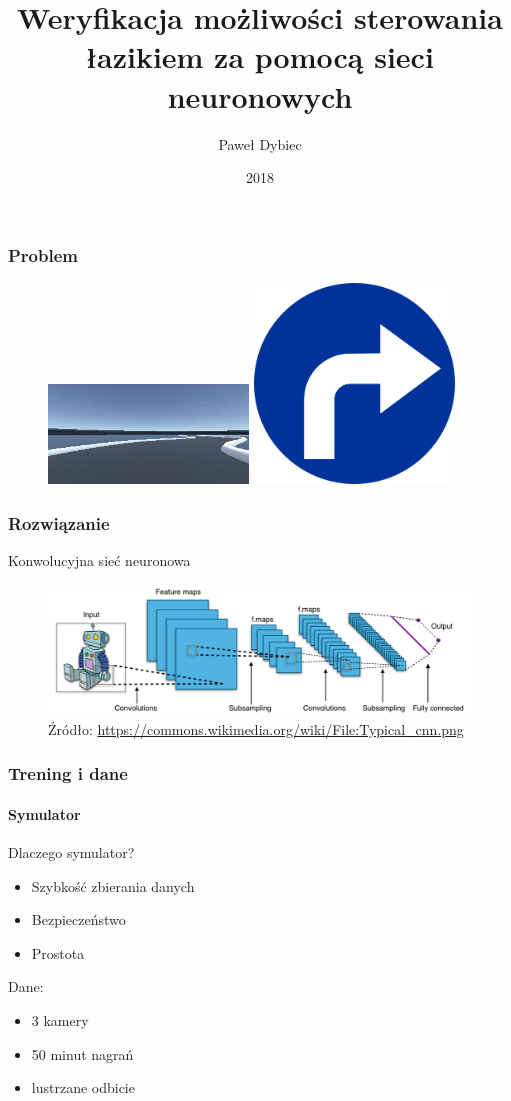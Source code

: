 \documentclass[polish]{beamer}
\title{Weryfikacja możliwości sterowania łazikiem za pomocą sieci neuronowych}
\author{Paweł Dybiec}
\date{2018}
\begin{document}
 
\frame{\titlepage}
 
\begin{frame}
\frametitle{Problem}
\begin{figure}
\includegraphics[width=0.475\textwidth]{sim.jpg}%
\hfill   
\includegraphics[width=0.475\textwidth]{nakaz_skretu.png}
\end{figure}
\end{frame}

\begin{frame}
\frametitle{Rozwiązanie}
Konwolucyjna sieć neuronowa 
\begin{figure}
\includegraphics[width=\textwidth]{Typical_cnn.png}
\caption{Źródło: \href{https://commons.wikimedia.org/wiki/File:Typical\_cnn.png}{https://commons.wikimedia.org/wiki/File:Typical\_cnn.png}}
\end{figure}
\end{frame}

\begin{frame}
\frametitle{Trening i dane}
\framesubtitle{Symulator}
Dlaczego symulator?
\pause
\begin{itemize}
\item Szybkość zbierania danych
\item Bezpieczeństwo
\item Prostota
\end{itemize}
\pause
Dane:
\begin{itemize}
\item 3 kamery
\item 50 minut nagrań
\item lustrzane odbicie
\end{itemize}
\end{frame}
\end{document}
